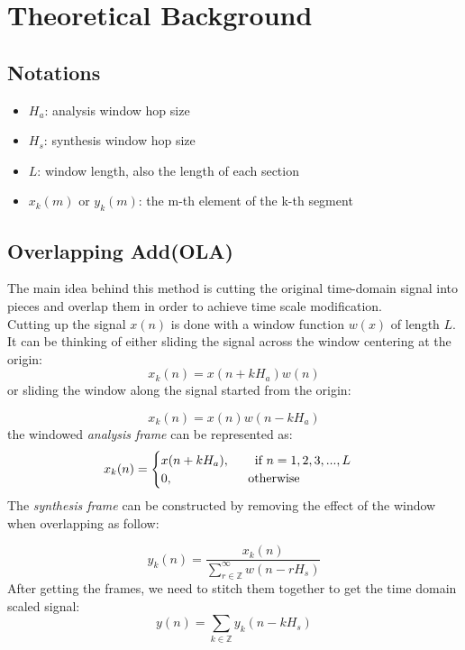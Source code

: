 \documentclass{article}
\begin{document}
\section{Theoretical Background}
\subsection{Notations}
\begin{itemize}
  \item $H_a$: analysis window hop size 
  \item $H_s$: synthesis window hop size
  \item $L$: window length, also the length of each section 
  \item $x_k(m)$ or $y_k(m)$: the m-th element of the k-th segment
\end{itemize}

\subsection{Overlapping Add(OLA)}
The main idea behind this method is  cutting the original time-domain signal into pieces and overlap them in order to achieve time scale modification.  \\
Cutting up the signal $x(n)$ is done with a window function $w(x)$ of length $L$. It can be thinking of either sliding the signal across the window centering at the origin: 
\begin{equation}
 x_{k}(n) =x(n+kH_a)w(n) 
\label{eq : }
\end{equation}
or sliding the window along the signal started from the origin: 

\begin{equation}
 x_{k}(n) =x(n)w(n-kH_a) 
\label{eq : }
\end{equation}
the windowed \textit{analysis frame} can be represented as: 
\begin{equation}
x_k(n) = \begin{cases}
        x(n +kH_a),  \text{\qquad if $n = 1,2,3,...,L$}\\
        0, \text{\qquad  \qquad \qquad otherwise} 
\end{cases}
\label{eq : }
\end{equation}
The \textit{synthesis frame} can be constructed by removing the effect of the window when overlapping as follow: 

\begin{equation}
        y_k(n) = \frac{x_{k}(n)}{\sum_{r\in \mathbb{Z}}^{\infty}w(n-rH_s) }
\label{eq : }
\end{equation}
After getting the frames, we need to stitch them together to get the time domain scaled signal: 
\begin{equation}
        y(n) =\sum_{k \in \mathbb{Z}} y_{k}(n - kH_s) \label{eq:}
\end{equation}
\end{document}
